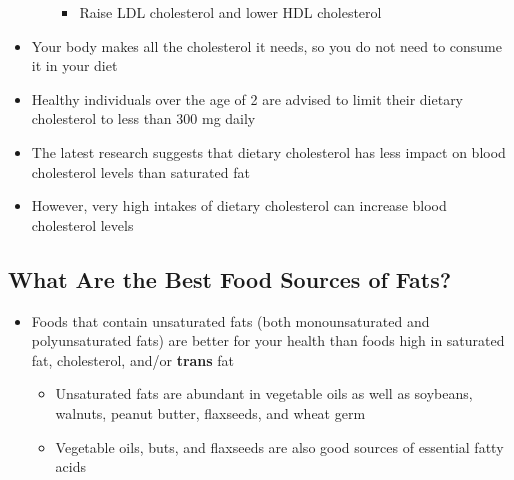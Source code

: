 \documentclass[12pt]{article}
\begin{document}
\begin{itemize}
\begin{itemize}
                            \begin{itemize}
                                \item Raise LDL cholesterol and lower HDL cholesterol
                            \end{itemize}
                    \end{itemize}
                \item Your body makes all the cholesterol it needs, so you do not need to consume it in your diet
                \item Healthy individuals over the age of 2 are advised to limit their dietary cholesterol to less than 300 mg daily
                \item The latest research suggests that dietary cholesterol has less impact on blood cholesterol levels than saturated fat
                \item However, very high intakes of dietary cholesterol can increase blood cholesterol levels
            \end{itemize}

        \subsection{What Are the Best Food Sources of Fats?}
            \begin{itemize}
                \item Foods that contain unsaturated fats (both monounsaturated and polyunsaturated fats) are better for your health than foods high in saturated fat, cholesterol, and/or \textbf{trans} fat
                    \begin{itemize}
                        \item Unsaturated fats are abundant in vegetable oils as well as soybeans, walnuts, peanut butter, flaxseeds, and wheat germ
                        \item Vegetable oils, buts, and flaxseeds are also good sources of essential fatty acids
                    \end{itemize}
            \end{itemize}
\end{document}
